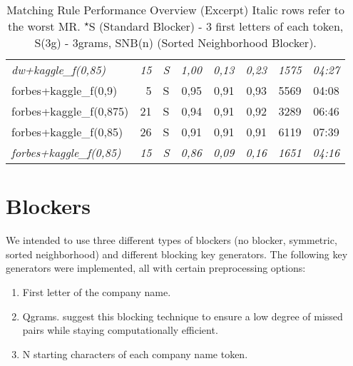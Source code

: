\documentclass[11pt,titlepage,oneside,openany]{book}
\begin{document}
\begin{table}[]
\begin{tabular}{lrcrrrrc}
		\textit{dw+kaggle\_f(0,85) }              & \textit{15}                   & \textit{S}         & \textit{1,00 }                 & \textit{0,13 }                 & \textit{0,23   }                & \textit{1575}                       & \textit{04:27}          \\\hdashline
		forbes+kaggle\_f(0,9)            & 5                      & S          & 0,95                  & 0,91                  & 0,93                   & 5569                       & 04:08          \\
		forbes+kaggle\_f(0,875)          & 21                     & S          & 0,94                  & 0,91                  & 0,92                   & 3289                       & 06:46          \\
		forbes+kaggle\_f(0,85)  & 26          & S & 0,91         & 0,91         & 0,91          & 6119              & 07:39 \\
		\textit{forbes+kaggle\_f(0,85)  }         & \textit{15}                     & \textit{S}          & \textit{0,86}                  &\textit{0,09}                 &\textit{0,16}                   & \textit{1651}                       & \textit{04:16}       
	\end{tabular}
\caption[Matching Rule Performance Overview (Excerpt)]{Matching Rule Performance Overview (Excerpt) \medspace\small Italic rows refer to the worst MR. \textsuperscript{$\star$}S (Standard Blocker) - 3 first letters of each token, S(3g) - 3grams, SNB(n) (Sorted Neighborhood Blocker).}
\label{tab:mr-performance}

\end{table}



\section{Blockers}
\label{sec:blockers}

We intended to use three different types of blockers (no blocker, symmetric, sorted neighborhood) and different blocking key generators. The following key generators were implemented, all with certain preprocessing options: \begin{enumerate}
	\item First letter of the company name.
	\item Qgrams. \cite{gravano_approximate_nodate} suggest this blocking technique to ensure a low degree of missed pairs while staying computationally efficient.
	\item N starting characters of each company name token.
\end{enumerate}
\end{document}
